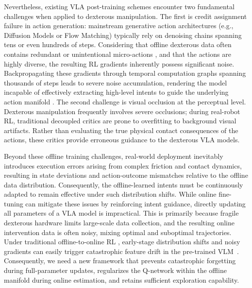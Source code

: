 \documentclass{article}
\begin{document}
Nevertheless, existing VLA post-training schemes \cite{xiang2025parallels,han2026dexhil} encounter two fundamental challenges when applied to dexterous manipulation. The first is credit assignment failure in action generation: mainstream generative action architectures (e.g., Diffusion Models or Flow Matching) typically rely on denoising chains spanning tens or even hundreds of steps. Considering that offline dexterous data often contains redundant or unintentional micro-actions \cite{mandlekar2021matters}, and that the actions are highly diverse, the resulting RL gradients inherently possess significant noise. Backpropagating these gradients through temporal computation graphs spanning thousands of steps leads to severe noise accumulation, rendering the model incapable of effectively extracting high-level intents to guide the underlying action manifold \cite{zhang2025pure}. The second challenge is visual occlusion at the perceptual level. Dexterous manipulation frequently involves severe occlusions; during real-robot RL, traditional decoupled critics are prone to overfitting to background visual artifacts. Rather than evaluating the true physical contact consequences of the actions, these critics provide erroneous guidance to the dexterous VLA models.


Beyond these offline training challenges, real-world deployment inevitably introduces execution errors arising from complex friction and contact dynamics, resulting in state deviations and action-outcome mismatches relative to the offline data distribution. Consequently, the offline-learned intents must be continuously adapted to remain effective under such distribution shifts. While online fine-tuning can mitigate these issues by reinforcing intent guidance, directly updating all parameters of a VLA model is impractical. This is primarily because fragile dexterous hardware limits large-scale data collection, and the resulting online intervention data is often noisy, mixing optimal and suboptimal trajectories. Under traditional offline-to-online RL \cite{intelligence2025pi}, early-stage distribution shifts and noisy gradients can easily trigger catastrophic feature drift in the pre-trained VLM~\cite{zhou2025efficient}. Consequently, we need a new framework that prevents catastrophic forgetting during full-parameter updates, regularizes the Q-network within the offline manifold during online estimation, and retains sufficient exploration capability.
\end{document}
